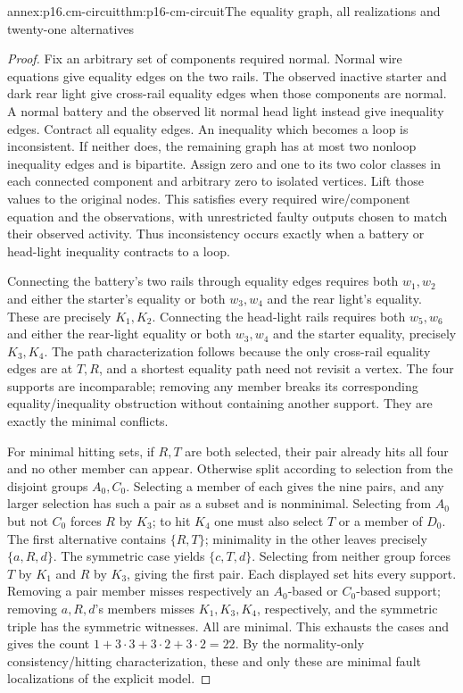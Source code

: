 \begin{annexitem}{annex:p16.cm-circuit}{thm:p16-cm-circuit}{The equality graph, all realizations and twenty-one alternatives}
\begin{proof}
Fix an arbitrary set of components required normal. Normal wire equations
give equality edges on the two rails. The observed inactive starter and
dark rear light give cross-rail equality edges when those components are
normal. A normal battery and the observed lit normal head light instead
give inequality edges. Contract all equality edges. An inequality which
becomes a loop is inconsistent. If neither does, the remaining graph has
at most two nonloop inequality edges and is bipartite. Assign zero and one
to its two color classes in each connected component and arbitrary zero
to isolated vertices. Lift those values to the original nodes. This satisfies
every required wire/component equation and the observations, with unrestricted
faulty outputs chosen to match their observed activity. Thus inconsistency
occurs exactly when a battery or head-light inequality contracts to a loop.

Connecting the battery's two rails through equality edges requires both
\(w_1,w_2\) and either the starter's equality or both \(w_3,w_4\)
and the rear light's equality. These are precisely \(K_1,K_2\).
Connecting the head-light rails requires both \(w_5,w_6\) and either
the rear-light equality or both \(w_3,w_4\) and the starter equality,
precisely \(K_3,K_4\). The path characterization follows because the
only cross-rail equality edges are at \(T,R\), and a shortest equality
path need not revisit a vertex. The four supports are incomparable;
removing any member breaks its corresponding equality/inequality obstruction
without containing another support. They are exactly the minimal conflicts.

For minimal hitting sets, if \(R,T\) are both selected, their pair
already hits all four and no other member can appear. Otherwise split
according to selection from the disjoint groups \(A_0,C_0\).
Selecting a member of each gives the nine pairs, and any larger selection
has such a pair as a subset and is nonminimal. Selecting from \(A_0\)
but not \(C_0\) forces \(R\) by \(K_3\); to hit \(K_4\) one
must also select \(T\) or a member of \(D_0\). The first alternative
contains \(\{R,T\}\); minimality in the other leaves precisely
\(\{a,R,d\}\). The symmetric case yields \(\{c,T,d\}\).
Selecting from neither group forces \(T\) by \(K_1\) and \(R\)
by \(K_3\), giving the first pair. Each displayed set hits every
support. Removing a pair member misses respectively an \(A_0\)-based
or \(C_0\)-based support; removing \(a,R,d\)'s members misses
\(K_1,K_3,K_4\), respectively, and the symmetric triple has the
symmetric witnesses. All are minimal. This exhausts the cases and gives
the count \(1+3\cdot3+3\cdot2+3\cdot2=22\).
By the normality-only consistency/hitting characterization, these and
only these are minimal fault localizations of the explicit model.
\end{proof}
\end{annexitem}

